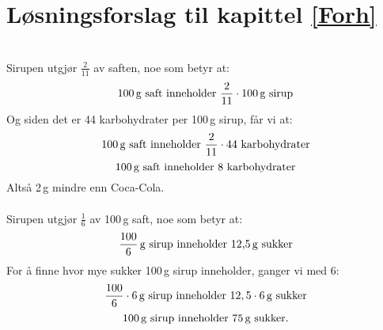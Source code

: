 

\usepackage{xr}




\section*{Løsningsforslag til kapittel \ref*{Forh}}

\\
Sirupen utgjør $ \frac{2}{11} $ av saften, noe som betyr at:
\[ \text{100\,g saft inneholder }\frac{2}{11}\cdot100\text{\,g sirup} \]
Og siden det er 44 karbohydrater per 100\,g sirup, får vi at:
\[ \text{100\,g saft inneholder }\frac{2}{11}\cdot\text{44 karbohydrater}\]
\[ \text{100\,g saft inneholder 8 karbohydrater}\]
Altså 2\,g mindre enn Coca-Cola. \\ \vsk
{}\\ 
Sirupen utgjør $ \frac{1}{6} $ av 100\,g saft, noe som betyr at:
\[ \frac{100}{6}\text{\,g sirup inneholder 12,5\,g sukker} \]
For å finne hvor mye sukker 100\,g sirup inneholder, ganger vi med 6:
\[ \frac{100}{6}\cdot6\text{\,g sirup inneholder $ 12,5\cdot6 $\,g sukker} \]
\[ \text{100\,g sirup inneholder 75\,g sukker.} \]


